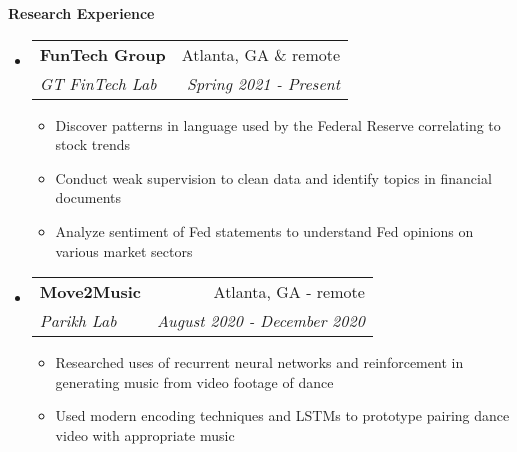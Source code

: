 \documentclass[letterpaper,10pt]{article}
\makeatletter
\newcommand{\resitem}[1]{\item #1 \vspace{-2pt}}
\newcommand{\resheading}[1]{{\large \colorbox{mygrey}{\begin{minipage}{\textwidth}{\textbf{#1 \vphantom{p\^{E}}}}\end{minipage}}}}
\newcommand{\ressubheading}[4]{
\begin{tabular*}{7.0in}{l@{\extracolsep{\fill}}r}
		\textbf{#1} & #2 \\
		\textit{#3} & \textit{#4} \\
\end{tabular*}\vspace{-6pt}}
\makeatother
\begin{document}
\resheading{Research Experience}
\begin{itemize}
\item
    \ressubheading{FunTech Group}{Atlanta, GA \& remote}{GT FinTech Lab}{Spring 2021 - Present}
    \begin{itemize}
        \resitem{Discover patterns in language used by the Federal Reserve correlating to stock trends}
        \resitem{Conduct weak supervision to clean data and identify topics in financial documents}
        \resitem{Analyze sentiment of Fed statements to understand Fed opinions on various market sectors}
    \end{itemize}
\item
    \ressubheading{Move2Music}{Atlanta, GA - remote}{Parikh Lab}{August 2020 - December 2020}
    \begin{itemize}
        \resitem{Researched uses of recurrent neural networks and reinforcement in generating music from video footage of dance}
        \resitem{Used modern encoding techniques and LSTMs to prototype pairing dance video with appropriate music}
    \end{itemize}

\end{itemize}
\end{document}
